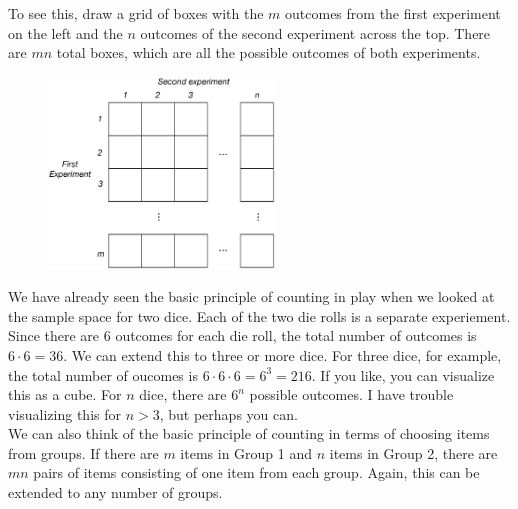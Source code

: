 \documentclass[12pt]{article}
\theoremstyle{definition}
\theoremstyle{remark}
\begin{document}
To see this, draw a grid of boxes with the $m$ outcomes from the first experiment on the left and the $n$ outcomes of the second experiment across the top. There are $mn$ total boxes, which are all the possible outcomes of both experiments.

\begin{figure}[H]
\centering
\includegraphics[width=6cm]{mnrule.eps}
\end{figure}

We have already seen the basic principle of counting in play when we looked at the sample space for two dice. Each of the two die rolls is a separate experiement. Since there are 6 outcomes for each die roll, the total number of outcomes is $6 \cdot 6 = 36$. We can extend this to three or more dice. For three dice, for example, the total number of oucomes is $6 \cdot 6 \cdot 6 = 6^3 = 216$. If you like, you can visualize this as a cube. For $n$ dice, there are $6^n$ possible outcomes. I have trouble visualizing this for $n > 3$, but perhaps you can.\\

We can also think of the basic principle of counting in terms of choosing items from groups. If there are $m$ items in Group 1 and $n$ items in Group 2, there are $mn$ pairs of items consisting of one item from each group. Again, this can be extended to any number of groups.\\
\end{document}
